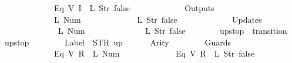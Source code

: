 \begin{isabellebody}
\ \ \ \ \ \ \ \ \ \ \ \ {\isacharparenleft}Eq\ {\isacharparenleft}V\ {\isacharparenleft}I\ {}{\isacharparenright}{\isacharparenright}\ {\isacharparenleft}L\ {\isacharparenleft}Str\ {\isacharprime}{\isacharprime}false{\isacharprime}{\isacharprime}{\isacharparenright}{\isacharparenright}{\isacharparenright}\isanewline
\ \ \ \ \ \ {\isacharbrackright}{\isacharcomma}\isanewline
\ \ \ \ \ \ Outputs\ {\isacharequal}\ {\isacharbrackleft}\isanewline
\ \ \ \ \ \ \ \ \ \ \ \ {\isacharparenleft}L\ {\isacharparenleft}Num\ {}{\isacharparenright}{\isacharparenright}{\isacharcomma}\isanewline
\ \ \ \ \ \ \ \ \ \ \ \ {\isacharparenleft}L\ {\isacharparenleft}Str\ {\isacharprime}{\isacharprime}false{\isacharprime}{\isacharprime}{\isacharparenright}{\isacharparenright}\isanewline
\ \ \ \ \ \ {\isacharbrackright}{\isacharcomma}\isanewline
\ \ \ \ \ \ Updates\ {\isacharequal}\ {\isacharbrackleft}\isanewline
\ \ \ \ \ \ \ \ \ \ \ \ {\isacharparenleft}{}{\isacharcomma}\ {\isacharparenleft}L\ {\isacharparenleft}Num\ {}{\isacharparenright}{\isacharparenright}{\isacharparenright}{\isacharcomma}\isanewline
\ \ \ \ \ \ \ \ \ \ \ \ {\isacharparenleft}{}{\isacharcomma}\ {\isacharparenleft}L\ {\isacharparenleft}Str\ {\isacharprime}{\isacharprime}false{\isacharprime}{\isacharprime}{\isacharparenright}{\isacharparenright}{\isacharparenright}\isanewline
\ \ \ \ \ \ {\isacharbrackright}\isanewline
{\isasymrparr}{\isachardoublequoteclose}\isanewline
\isanewline
{}\isamarkupfalse%
\ {\isachardoublequoteopen}up{}{}stop{\isachardoublequoteclose}\ {\isacharcolon}{\isacharcolon}\ {\isachardoublequoteopen}transition{\isachardoublequoteclose}\ \isanewline
{\isachardoublequoteopen}up{}{}stop\ {\isasymequiv}\ {\isasymlparr}\isanewline
\ \ \ \ \ \ Label\ {\isacharequal}\ STR\ {\isacharprime}{\isacharprime}up{\isacharprime}{\isacharprime}{\isacharcomma}\isanewline
\ \ \ \ \ \ Arity\ {\isacharequal}\ {}{\isacharcomma}\isanewline
\ \ \ \ \ \ Guards\ {\isacharequal}\ {\isacharbrackleft}\isanewline
\ \ \ \ \ \ \ \ \ \ \ \ {\isacharparenleft}Eq\ {\isacharparenleft}V\ {\isacharparenleft}R\ {}{\isacharparenright}{\isacharparenright}\ {\isacharparenleft}L\ {\isacharparenleft}Num\ {}{\isacharparenright}{\isacharparenright}{\isacharparenright}{\isacharcomma}\isanewline
\ \ \ \ \ \ \ \ \ \ \ \ {\isacharparenleft}Eq\ {\isacharparenleft}V\ {\isacharparenleft}R\ {}{\isacharparenright}{\isacharparenright}\ {\isacharparenleft}L\ {\isacharparenleft}Str\ {\isacharprime}{\isacharprime}false{\isacharprime}{\isacharprime}{\isacharparenright}{\isacharparenright}{\isacharparenright}{\isacharcomma}\isanewline

\end{isabellebody}
